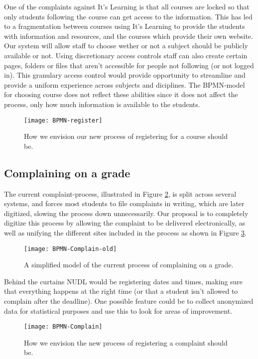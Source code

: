 \noindent
One of the complaints against It's Learning is that all courses are locked so that only students following the course can get access to the information. This has led to a 
fragmentation between courses using It's Learning to provide the students with information and resources, and the courses which provide their own website. Our system will allow staff
to choose wether or not a subject should be publicly available or not. Using discretionary access controls staff can also create certain pages, folders or files that aren't accessible for people not following (or not logged in). This granulary access control would provide opportunity to streamline and provide a uniform experience across subjects and diciplines. The BPMN-model for choosing course does not reflect these abilities since it does not affect the process, only how much information is available to the students. 

\begin{figure}[H]
    \centering
    \texttt{[image: BPMN-register]}
    \caption{How we envision our new process of registering for a course should be.}
    \label{fig:Register-new}
\end{figure}

\subsection{Complaining on a grade}
	The current complaint-process, illustrated in Figure \ref{fig:Complain-old}, is split across several systems, and forces most students to file complaints in writing,
which are later digitized, slowing the process down unnecessarily. Our proposal is to completely digitize this process by allowing the complaint to be delivered electronically,
as well as unifying the different sites included in the process as shown in Figure \ref{fig:Complain-new}.\\

\begin{figure}[H]
    \centering
    \texttt{[image: BPMN-Complain-old]}
    \caption{A simplified model of the current process of complaining on a grade.}
    \label{fig:Complain-old}
\end{figure}
\noindent
Behind the curtains NUDL would be registering dates and times, making sure that everything happens at the right time (or that a student isn't allowed to complain after the deadline). One possible feature could be to collect anonymized data for statistical purposes and use this to look for areas of improvement.

\begin{figure}[H]
    \centering
    \texttt{[image: BPMN-Complain]}
    \caption{How we envision the new process of registering a complaint should be.}
    \label{fig:Complain-new}
\end{figure}
